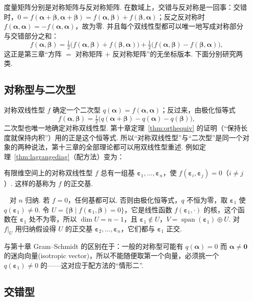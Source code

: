 \documentclass[lang=cn,10.5pt,scheme=chinese,toc=twocol,section,chinesefont=nofont,
twoside,citestyle=gb7714-2015,bibstyle=gb7714-2015]{elegantbook}
\DeclareRobustCommand{\textbf}[1]{{\lnsemiboldlatin\lnsemiboldcjk #1}}
\newcommand{\vv}[1]{\boldsymbol{#1}}
\newcommand{\zero}{\boldsymbol{0}}          %
\numberwithin{equation}{section}   %
\newcommand{\spn}{\operatorname{span}}      %
\newcommand*{\lnlabel}[1]{{\sffamily\bfseries\color{black}#1}}
\renewenvironment{proof}{%
	\par\noindent\lnlabel{\proofname}\;\ \color{black!90}\cfs}{\par}
\begin{document}
度量矩阵分别是对称矩阵与反对称矩阵. 在数域上，交错与反对称是一回事：交错时，$0=f(\vv\alpha+\vv\beta,\vv\alpha+\vv\beta)=f(\vv\alpha,\vv\beta)+f(\vv\beta,\vv\alpha)$；反之反对称时 $f(\vv\alpha,\vv\alpha)=-f(\vv\alpha,\vv\alpha)$，故为零. 并且每个双线性型都可以唯一地写成对称部分与交错部分之和：
\[f(\vv\alpha,\vv\beta)=\tfrac12\big(f(\vv\alpha,\vv\beta)+f(\vv\beta,\vv\alpha)\big)+\tfrac12\big(f(\vv\alpha,\vv\beta)-f(\vv\beta,\vv\alpha)\big),\]
这正是第三章“方阵 $=$ 对称矩阵 $+$ 反对称矩阵”的无坐标版本. 下面分别研究两类.

\subsection{对称型与二次型}

对称双线性型 $f$ 确定一个二次型 $q(\vv\alpha)=f(\vv\alpha,\vv\alpha)$；反过来，由\textbf{极化恒等式}
\[f(\vv\alpha,\vv\beta)=\tfrac12\big(q(\vv\alpha+\vv\beta)-q(\vv\alpha)-q(\vv\beta)\big),\]
二次型也唯一地确定对称双线性型. 第十章定理~\ref{thm:orthequiv} 的证明（“保持长度就保持内积”）用的正是这个恒等式. 所以“对称双线性型”与“二次型”是同一个对象的两种说法，第十三章的全部理论都可以用双线性型重述. 例如定理~\ref{thm:lagrangediag}（配方法）变为：

\begin{theorem}
  \label{thm:symdiag}
  有限维空间上的对称双线性型 $f$ 总有一组基 $\vv\varepsilon_1,\ldots,\vv\varepsilon_n$，使 $f(\vv\varepsilon_i,\vv\varepsilon_j)=0$（$i\ne j$）. 这样的基称为 $f$ 的\textbf{正交基}.
\end{theorem}
\begin{proof}
  对 $n$ 归纳. 若 $f=0$，任何基都可以. 否则由极化恒等式，$q$ 不恒为零，取 $\vv\varepsilon_1$ 使 $q(\vv\varepsilon_1)\ne0$. 令 $U=\{\vv\beta\mid f(\vv\varepsilon_1,\vv\beta)=0\}$，它是线性函数 $f(\vv\varepsilon_1,\cdot)$ 的核，这个函数在 $\vv\varepsilon_1$ 处不为零，所以 $\dim U=n-1$，且 $\vv\varepsilon_1\notin U$，$V=\spn(\vv\varepsilon_1)\oplus U$. 对 $f|_U$ 用归纳假设得 $U$ 的正交基 $\vv\varepsilon_2,\ldots,\vv\varepsilon_n$，它们都与 $\vv\varepsilon_1$ 正交.
\end{proof}

与第十章 Gram–Schmidt 的区别在于：一般的对称型可能有 $q(\vv\alpha)=0$ 而 $\vv\alpha\ne\zero$ 的\textbf{迷向向量}(isotropic vector)，所以不能随便取第一个向量，必须挑一个 $q(\vv\varepsilon_1)\neq0$ 的——这对应于配方法的“情形二”.

\subsection{交错型}
\end{document}

